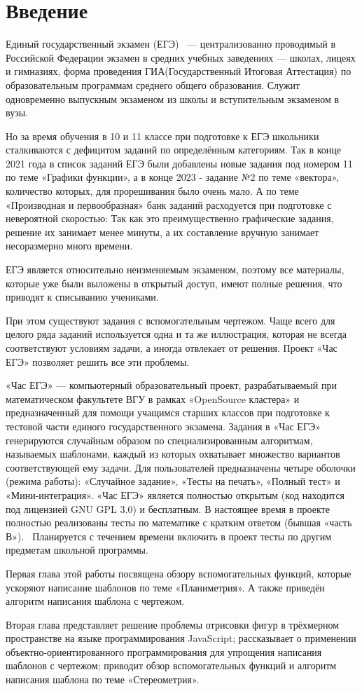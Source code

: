 
\section*{Введение}
Единый государственный экзамен (ЕГЭ)~ — централизованно проводимый в Российской
Федерации экзамен в средних учебных заведениях — школах, лицеях и гимназиях,
форма проведения ГИА(Государственный Итоговая Аттестация) по образовательным программам среднего общего образования.
Служит одновременно выпускным экзаменом из школы и вступительным экзаменом в вузы.

Но за время обучения в 10 и 11 классе при подготовке к ЕГЭ школьники сталкиваются с дефицитом заданий по определённым категориям.
Так в конце 2021 года в список заданий ЕГЭ были добавлены новые задания под номером 11 по теме «Графики функции», а в конце 2023 - задание №2 по теме «вектора», количество которых, для прорешивания было очень мало. 
А по теме «Производная и первообразная» банк заданий расходуется при подготовке с невероятной скоростью:
Так как это преимущественно графические задания, решение их занимает менее минуты, а их составление вручную занимает несоразмерно много времени.

ЕГЭ является относительно неизменяемым экзаменом, поэтому все материалы, которые уже были выложены в открытый доступ, имеют полные решения, что приводят к списыванию учениками.

При этом существуют задания с вспомогательным чертежом. Чаще всего для целого ряда заданий используется одна и та же иллюстрация, которая не всегда соответствуют условиям задачи, а иногда отвлекает от решения.
Проект «Час ЕГЭ» позволяет решить все эти проблемы.

«Час ЕГЭ» — компьютерный образовательный проект, разрабатываемый при математическом
факультете ВГУ в рамках «OpenSource кластера» и предназначенный для помощи учащимся
старших классов при подготовке к тестовой части единого государственного экзамена.
Задания в «Час ЕГЭ» генерируются случайным образом по специализированным алгоритмам,
называемых шаблонами, каждый из которых
охватывает множество вариантов соответствующей ему задачи. Для
пользователей
предназначены четыре оболочки (режима работы): «Случайное задание», «Тесты на печать»,
«Полный тест» и «Мини-интеграция».
«Час ЕГЭ» является полностью открытым (код находится под лицензией GNU GPL 3.0)
и бесплатным.
В настоящее время в проекте полностью реализованы тесты по математике с кратким
ответом (бывшая «часть В»).~\cite{fipi}
Планируется с течением времени включить в проект тесты по другим предметам школьной
программы.

Первая глава этой работы посвящена обзору вспомогательных функций, которые ускоряют написание шаблонов по теме «Планиметрия». А также приведён алгоритм написания шаблона с чертежом.

Вторая глава представляет решение проблемы отрисовки фигур в трёхмерном пространстве на языке программирования JavaScript; рассказывает о применении объектно-ориентированного программирования для упрощения написания шаблонов с чертежом; приводит обзор вспомогательных функций и алгоритм написания шаблона по теме «Стереометрия».
